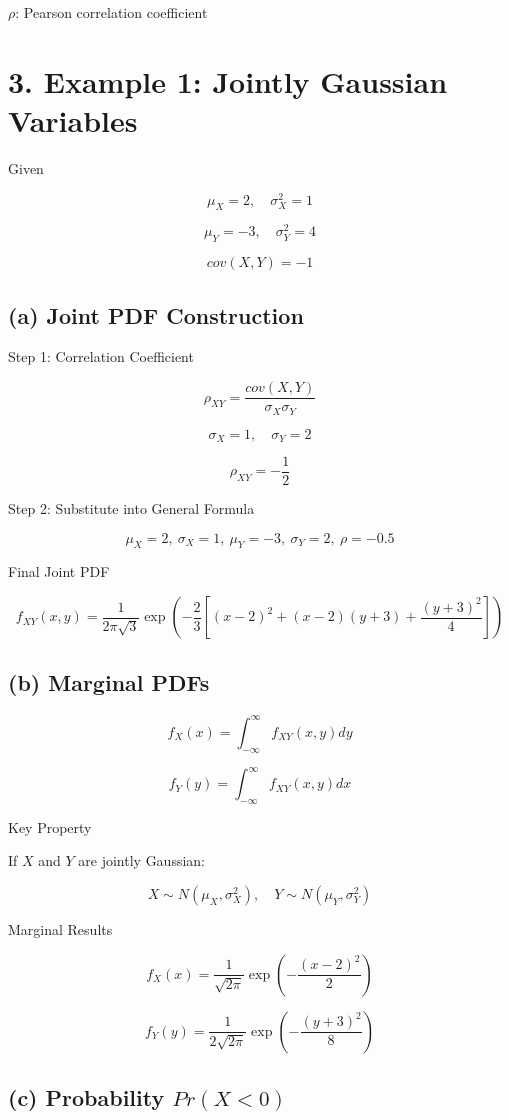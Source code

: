 \documentclass[12pt]{article}
\begin{document}
$\rho$: Pearson correlation coefficient

\section*{3. Example 1: Jointly Gaussian Variables}

Given

\[
\mu_X=2,\quad \sigma_X^2=1
\]

\[
\mu_Y=-3,\quad \sigma_Y^2=4
\]

\[
cov(X,Y)=-1
\]

\subsection*{(a) Joint PDF Construction}

Step 1: Correlation Coefficient

\[
\rho_{XY}=\frac{cov(X,Y)}{\sigma_X\sigma_Y}
\]

\[
\sigma_X=1,\quad \sigma_Y=2
\]

\[
\rho_{XY}=-\frac{1}{2}
\]

Step 2: Substitute into General Formula

\[
\mu_X=2,\ \sigma_X=1,\ \mu_Y=-3,\ \sigma_Y=2,\ \rho=-0.5
\]

Final Joint PDF

\[
f_{XY}(x,y)=
\frac{1}{2\pi\sqrt{3}}
\exp\left(
-\frac{2}{3}
\left[
(x-2)^2
+
(x-2)(y+3)
+
\frac{(y+3)^2}{4}
\right]
\right)
\]

\subsection*{(b) Marginal PDFs}

\[
f_X(x)=\int_{-\infty}^{\infty} f_{XY}(x,y) dy
\]

\[
f_Y(y)=\int_{-\infty}^{\infty} f_{XY}(x,y) dx
\]

Key Property

If $X$ and $Y$ are jointly Gaussian:

\[
X\sim N(\mu_X,\sigma_X^2),\quad Y\sim N(\mu_Y,\sigma_Y^2)
\]

Marginal Results

\[
f_X(x)=\frac{1}{\sqrt{2\pi}} \exp\left(-\frac{(x-2)^2}{2}\right)
\]

\[
f_Y(y)=\frac{1}{2\sqrt{2\pi}} \exp\left(-\frac{(y+3)^2}{8}\right)
\]

\subsection*{(c) Probability $Pr(X<0)$}
\end{document}

